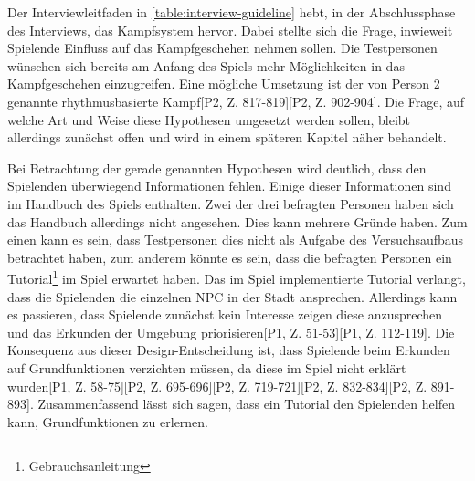Der Interviewleitfaden in \autoref{table:interview-guideline} hebt, in der Abschlussphase des Interviews, das Kampfsystem hervor.
Dabei stellte sich die Frage, inwieweit Spielende Einfluss auf das Kampfgeschehen nehmen sollen.
Die Testpersonen wünschen sich bereits am Anfang des Spiels mehr Möglichkeiten in das Kampfgeschehen einzugreifen\hypothesis[P1, Z. 572-601][P2, Z. 898-901][P3, Z. 1336-1343].
Eine mögliche Umsetzung ist der von Person 2 genannte rhythmusbasierte Kampf[P2, Z. 817-819][P2, Z. 902-904].
Die Frage, auf welche Art und Weise diese Hypothesen umgesetzt werden sollen, bleibt allerdings zunächst offen und wird in einem späteren Kapitel näher behandelt.

Bei Betrachtung der gerade genannten Hypothesen wird deutlich, dass den Spielenden überwiegend Informationen fehlen.
Einige dieser Informationen sind im Handbuch des Spiels enthalten.
Zwei der drei befragten Personen haben sich das Handbuch allerdings nicht angesehen.
Dies kann mehrere Gründe haben.
Zum einen kann es sein, dass Testpersonen dies nicht als Aufgabe des Versuchsaufbaus betrachtet haben, zum anderem könnte es sein, dass die befragten Personen ein Tutorial\footnote{Gebrauchsanleitung} im Spiel erwartet haben.
Das im Spiel implementierte Tutorial verlangt, dass die Spielenden die einzelnen \ac{NPC} in der Stadt ansprechen.
Allerdings kann es passieren, dass Spielende zunächst kein Interesse zeigen diese anzusprechen und das Erkunden der Umgebung priorisieren[P1, Z. 51-53][P1, Z. 112-119].
Die Konsequenz aus dieser Design-Entscheidung ist, dass Spielende beim Erkunden auf Grundfunktionen verzichten müssen, da diese im Spiel nicht erklärt wurden[P1, Z. 58-75][P2, Z. 695-696][P2, Z. 719-721][P2, Z. 832-834][P2, Z. 891-893].
Zusammenfassend lässt sich sagen, dass ein Tutorial den Spielenden helfen kann, Grundfunktionen zu erlernen\hypothesis.

